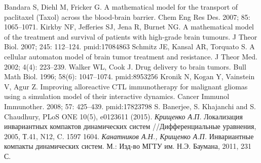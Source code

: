 \documentclass[12pt,a4paper]{extarticle}
\theoremstyle{definition}
\theoremstyle{definition}
\theoremstyle{definition}
\begin{document}
\begin{thebibliography}{19}
		Bandara S, Diehl M, Fricker G. A mathematical model for the transport of paclitaxel (Taxol) across the blood-brain barrier. Chem Eng Res Des. 2007; 85: 1065–1071.
		Kirkby NF, Jefferies SJ, Jena R, Burnet NG. A mathematical model of the treatment and survival of patients with high-grade brain tumours. J Theor Biol. 2007; 245: 112–124. pmid:17084863
		Schmitz JE, Kansal AR, Torquato S. A cellular automaton model of brain tumor treatment and resistance. J Theor Med. 2002; 4(4): 223–239.
		Walker WL, Cook J. Drug delivery to brain tumors. Bull Math Biol. 1996; 58(6): 1047–1074. pmid:8953256
		Kronik N, Kogan Y, Vainstein V, Agur Z. Improving alloreactive CTL immunotherapy for malignant gliomas using a simulation model of their interactive dynamics. Cancer Immunol Immunother. 2008; 57: 425–439. pmid:17823798
		S. Banerjee, S. Khajanchi and S. Chaudhury, PLoS ONE 10(5), e0123611 (2015). 
		\textit{Крищенко А.П.} Локализация инвариантных компактов динамических систем //Дифференциальные уравнения, 2005, Т.41, N12, C. 1597 1604.
		\textit{Канатников А.Н., Крищенко А.П.} Инвариантные компакты динамических систем. М.: Изд-во МГТУ им. Н.Э. Баумана, 2011, 231 С.
	\end{thebibliography}
\end{document}

